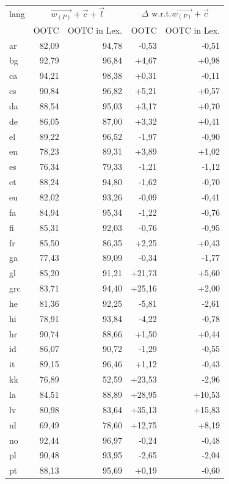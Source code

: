 \documentclass[11pt,a4paper]{article}
\begin{document}
\begin{table}[th]
\centering\scriptsize
\begin{tabular}{lrrrr}
\toprule
lang & \multicolumn{2}{c}{$\vec{w_{(P)}}+\vec{c}+\vec{l}$}& \multicolumn{2}{c}{$\Delta$ w.r.t.$\vec{w_{(P)}}+\vec{c}$}\\[1mm]
 & OOTC & OOTC in Lex. & OOTC & OOTC in Lex.\\
\midrule
ar & 82,09 & 94,78 & -0,53 & -0,51\\
bg & 92,79 & 96,84 & +4,67 & +0,98\\
ca & 94,21 & 98,38 & +0,31 & -0,11\\
cs & 90,84 & 96,82 & +5,21 & +0,57\\
da & 88,54 & 95,03 & +3,17 & +0,70\\
de & 86,05 & 87,00 & +3,32 & +0,41\\
el & 89,22 & 96,52 & -1,97 & -0,90\\
en & 78,23 & 89,31 & +3,89 & +1,02\\
es & 76,34 & 79,33 & -1,21 & -1,12\\
et & 88,24 & 94,80 & -1,62 & -0,70\\
eu & 82,02 & 93,26 & -0,09 & -0,41\\
fa & 84,94 & 95,34 & -1,22 & -0,76\\
fi & 85,31 & 92,03 & -0,76 & -0,95\\
fr & 85,50 & 86,35 & +2,25 & +0,43\\
ga & 77,43 & 89,09 & -0,34 & -1,77\\
gl & 85,20 & 91,21 & +21,73 & +5,60\\
grc & 83,71 & 94,40 & +25,16 & +2,00\\
he & 81,36 & 92,25 & -5,81 & -2,61\\
hi & 78,91 & 93,84 & -4,22 & -0,78\\
hr & 90,74 & 88,66 & +1,50 & +0,44\\
id & 86,07 & 90,72 & -1,29 & -0,55\\
it & 89,15 & 96,46 & +1,12 & -0,43\\
kk & 76,89 & 52,59 & +23,53 & -2,96\\
la & 84,51 & 88,89 & +28,95 & +10,53\\
lv & 80,98 & 83,64 & +35,13 & +15,83\\
nl & 69,49 & 78,60 & +12,75 & +8,19\\
no & 92,44 & 96,97 & -0,24 & -0,48\\
pl & 90,48 & 93,95 & -2,65 & -2,04\\
pt & 88,13 & 95,69 & +0,19 & -0,60\\

\end{tabular}
\end{table}
\end{document}
